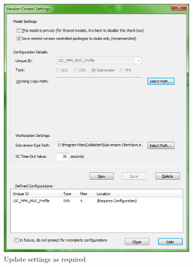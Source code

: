 \begin{enumerate}
\begin{figure}[!htbp]
\begin{center}
	\includegraphics[width=0.9\textwidth]{012}
	\caption{Update settings as required}
  	\label{fig:advanced-topics-eaSVN-setWorkingCopyPath}
\end{center}
\end{figure}

\end{enumerate}
